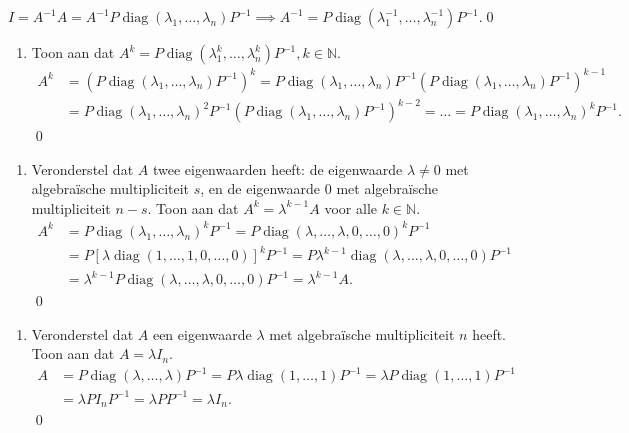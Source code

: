 \begin{oefening}[6.3.5]
\begin{enumerate}
        \(I
        = A^{-1}A
        = A^{-1}P \operatorname{diag}(\lambda_1, \dots, \lambda_n) P^{-1}
        \implies A^{-1} = P \operatorname{diag}(\lambda_1^{-1}, \dots, \lambda_n^{-1}) P^{-1}
        \).\qed
    \end{enumerate}
    \begin{enumerate}
        \item[(b)] Toon aan dat $A^k = P \operatorname{diag}(\lambda_1^k, \dots, \lambda_n^k)P^{-1}, k \in \mathbb{N}$.
        \begin{align*}
        A^k
        &= \left( P \operatorname{diag}(\lambda_1, \dots, \lambda_n) P^{-1}\right)^k
        =  P \operatorname{diag}(\lambda_1, \dots, \lambda_n) P^{-1}\left( P \operatorname{diag}(\lambda_1, \dots, \lambda_n) P^{-1}\right)^{k-1}\\
        &=  P \operatorname{diag}(\lambda_1, \dots, \lambda_n)^2 P^{-1}\left( P \operatorname{diag}(\lambda_1, \dots, \lambda_n) P^{-1}\right)^{k-2}
        = \dots =  P \operatorname{diag}(\lambda_1, \dots, \lambda_n)^k P^{-1}.
        \end{align*}\qed
    \end{enumerate}
    \begin{enumerate}
        \item[(c)] Veronderstel dat $A$ twee eigenwaarden heeft: de eigenwaarde $\lambda \neq 0$ met algebraïsche multipliciteit $s$, en de eigenwaarde $0$ met algebraïsche multipliciteit $n - s$. Toon aan dat $A^k = \lambda^{k-1}A$ voor alle $k \in \mathbb{N}$.
        \begin{align*}
            A^k
            &= P \operatorname{diag}(\lambda_1, \dots, \lambda_n)^k P^{-1}
            = P \operatorname{diag}(\lambda, \dots, \lambda,0, \dots, 0)^k P^{-1}\\
            &= P \left[\lambda\operatorname{diag}(1, \dots, 1,0, \dots, 0)\right]^k P^{-1}
            = P \lambda^{k-1}\operatorname{diag}(\lambda, \dots, \lambda,0, \dots, 0) P^{-1}\\
            &=\lambda^{k-1}P\operatorname{diag}(\lambda, \dots, \lambda,0, \dots, 0) P^{-1}
            = \lambda^{k-1}A.
        \end{align*}\qed
    \end{enumerate}
    \begin{enumerate}
        \item[(d)] Veronderstel dat $A$ een eigenwaarde $\lambda$ met algebraïsche multipliciteit $n$ heeft. Toon aan dat $A = \lambda I_n$.
        \begin{align*}
            A
            &= P\operatorname{diag}(\lambda, \dots, \lambda) P^{-1}
            = P\lambda\operatorname{diag}(1, \dots, 1) P^{-1}
            =\lambda P\operatorname{diag}(1, \dots, 1) P^{-1} \\
            &= \lambda P I_n P^{-1}
            = \lambda P P^{-1}
            = \lambda I_n.
        \end{align*} \qed
    \end{enumerate}
\end{oefening}

